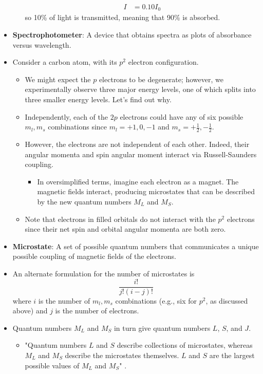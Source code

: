 \documentclass[../notes.tex]{subfiles}
\begin{document}
\begin{itemize}
\begin{itemize}
\begin{align*}
            I &= 0.10I_0
        \end{align*}
        so 10\% of light is transmitted, meaning that 90\% is absorbed.
    \end{itemize}
    \item \textbf{Spectrophotometer}: A device that obtains spectra as plots of absorbance versus wavelength.
    \item Consider a carbon atom, with its $p^2$ electron configuration.
    \begin{itemize}
        \item We might expect the $p$ electrons to be degenerate; however, we experimentally observe three major energy levels, one of which splits into three smaller energy levels. Let's find out why.
        \item Independently, each of the $2p$ electrons could have any of six possible $m_l,m_s$ combinations since $m_l=+1,0,-1$ and $m_s=+\frac{1}{2},-\frac{1}{2}$.
        \item However, the electrons are not independent of each other. Indeed, their angular momenta and spin angular moment interact via Russell-Saunders coupling.
        \begin{itemize}
            \item In oversimplified terms, imagine each electron as a magnet. The magnetic fields interact, producing microstates that can be described by the new quantum numbers $M_L$ and $M_S$.
        \end{itemize}
        \item Note that electrons in filled orbitals do not interact with the $p^2$ electrons since their net spin and orbital angular momenta are both zero.
    \end{itemize}
    \item \textbf{Microstate}: A set of possible quantum numbers that communicates a unique possible coupling of magnetic fields of the electrons.
    \item An alternate formulation for the number of microstates is
    \begin{equation*}
        \frac{i!}{j!(i-j)!}
    \end{equation*}
    where $i$ is the number of $m_l,m_s$ combinations (e.g., six for $p^2$, as discussed above) and $j$ is the number of electrons.
    \item Quantum numbers $M_L$ and $M_S$ in turn give quantum numbers $L$, $S$, and $J$.
    \begin{itemize}
        \item "Quantum numbers $L$ and $S$ describe collections of microstates, whereas $M_L$ and $M_S$ describe the microstates themselves. $L$ and $S$ are the largest possible values of $M_L$ and $M_S$" \parencite[408]{bib:MiesslerFischerTarr}.

\end{itemize}
\end{itemize}
\end{document}
